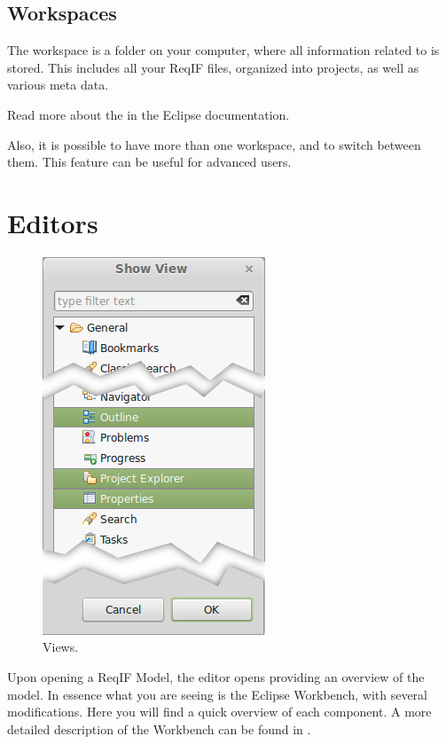 \subsection{Workspaces}
\label{sec:workspaces}

The workspace is a folder on your computer, where all information related to \pror{} is stored.  This includes all your ReqIF files, organized into projects, as well as various meta data.

\begin{info}
Read more about the  in the Eclipse documentation.

Also, it is possible to have more than one workspace, and to switch between them.  This feature can be useful for advanced users.
\end{info}

\section{Editors}

\begin{figure}
\centering
\includegraphics[width=.3\textwidth]{../rmf-images/views_highlighted.png}
\caption{Views.}
\label{fig:Views}
\end{figure}

Upon opening a ReqIF Model, the editor opens providing an overview of the model.  In essence what you are seeing is the Eclipse Workbench, with several modifications.  Here you will find a quick overview of each component.  A more detailed description of the Workbench can be found in 
.

